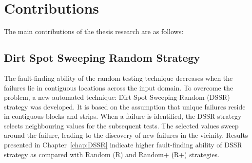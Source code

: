 


\section{Contributions}
The main contributions of the thesis research are as follows: 

\subsection{Dirt Spot Sweeping Random Strategy}

The fault-finding ability of the random testing technique decreases when the failures lie in contiguous locations across the input domain. To overcome the problem, a new automated technique: Dirt Spot Sweeping Random (DSSR) strategy was developed. It is based on the assumption that unique failures reside in contiguous blocks and strips. When a failure is identified, the DSSR strategy selects neighbouring values for the subsequent tests. The selected values sweep around the failure, leading to the discovery of new failures in the vicinity. Results presented in Chapter~\ref{chap:DSSR} indicate higher fault-finding ability of DSSR strategy as compared with Random (R) and Random+ (R+) strategies.

